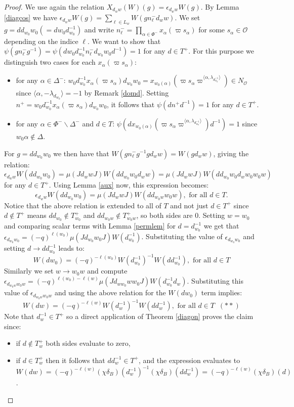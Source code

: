 \documentclass[10pt,a4paper]{amsart}
\begin{document}
\begin{proof}
We use again the relation $X_{d_ww}(W)(g)=\epsilon_{d_ww}W(g)$. By Lemma \ref{diagcos} we have
$\epsilon_{d_ww}W(g)=\sum\limits_{\ell\in L_w}W(gn_{\ell}^-d_ww)$. We set $g=dd_{w_0}w_0(=dw_0d_{w_0}^{-1})$ and write $n_{\ell}^-=\prod\limits_{\alpha\in \Phi^-}x_{\alpha}(\varpi s_{\alpha})$ for some $s_{\alpha}\in\mathcal{O}$ depending on the indice $\ell$. We want to show that $\psi(gn_{\ell}^-g^{-1})=\psi(dw_0d_{w_0}^{-1}n_{\ell}^-d_{w_0}w_0d^{-1})=1$ for any $d\in T^+$. For this purpose we distinguish two cases for each $x_{\alpha}(\varpi s_{\alpha})$: 
\begin{itemize}
    \item for any $\alpha\in\Delta^-$: $w_0d_{w_0}^{-1}x_{\alpha}(\varpi s_{\alpha})d_{w_0}w_0=x_{w_0(\alpha)}(\varpi s_{\alpha}\varpi^{\langle\alpha,\lambda_{d_{w_0}^{-1}}\rangle})\in N_{\mathcal{O}}$ since $\langle\alpha,-\lambda_{d_{w_0}}\rangle={-1}$ by Remark \ref{domd}. Setting $n^+=w_0d_{w_0}^{-1}x_{\alpha}(\varpi s_{\alpha})d_{w_0}w_0$, it follows that $\psi(dn^+d^{-1})=1$ for any $d\in T^+$.
    \item for any $\alpha\in\Phi^-\backslash\Delta^-$ and $d\in T$: $\psi(dx_{w_0(\alpha)}(\varpi s_{\alpha}\varpi^{\langle\alpha,\lambda_{d_{w_0}^{-1}}\rangle})d^{-1})=1$ since $w_0\alpha\not\in\Delta$.
\end{itemize} For $g=dd_{w_0}w_0$ we then have that $W(gn_{\ell}^-g^{-1}gd_ww)=W(gd_ww)$, giving the relation:  $$\epsilon_{d_ww}W(dd_{w_0}w_0)=\mu(Jd_wwJ)W(dd_{w_0}w_0d_ww)=\mu(Jd_wwJ)W(dd_{w_0}w_0d_ww_0w_0w)$$ for any $d\in T^+$. Using Lemma \ref{aux} now, this expression becomes:
$$\epsilon_{d_ww}W(dd_{w_0}w_0)=\mu(Jd_wwJ)W(dd_{w_0w}w_0w),\text{ for all } d\in T.$$
Notice that the above relation is extended to all of $T$ and not just $d\in T^+$ since $d\not\in T^+$ means $dd_{w_0}\not\in T_{w_0}^+$ and $dd_{w_0w}\not\in T_{w_0w}^+$, so both sides are $0$.
Setting $w=w_0$ and comparing scalar terms with Lemma \ref{permlem} for $d=d_{w_0}^{-1}$ we get that $\epsilon_{d_{w_0}w_0}=(-q)^{\ell(w_0)}\mu(Jd_{w_0}w_0J)W(d_{w_0}^{-1})$. Substituting the value of $\epsilon_{d_{w_0}w_0}$ and setting $d\to dd_{w_0}^{-1}$ leads to: 
$$W(dw_0)=(-q)^{-\ell(w_0)}W(d_{w_0}^{-1})^{-1}W(dd_{w_0}^{-1}), \text{ for all } d\in T$$ Similarly we set $w\to w_0w$ and compute $\epsilon_{d_{w_0w}w_0w}=(-q)^{\ell(w_0)-\ell(w)}\mu(Jd_{ww_0}ww_0J)W(d_{w_0}^{-1}d_w)$. Substituting this value of $\epsilon_{d_{w_0w}w_0w}$ and using the above relation for the $W(dw_0)$ term implies:
$$W(dw)=(-q)^{-\ell(w)}W(d_{w}^{-1})^{-1}W(dd_{w}^{-1}), \text{ for all } d\in T \; \; (**)$$ Note that $d_w^{-1}\in T^+$ so a direct application of Theorem \ref{diagon} proves the claim since: 
\begin{itemize}
    \item if $d\not\in T_w^+$ both sides evaluate to zero,
    \item if $d\in T_w^+$ then it follows that $dd_w^{-1}\in T^+$, and the expression evaluates to $W(dw)=(-q)^{-\ell(w)}(\chi\delta_B)(d_w^{-1})^{-1}(\chi\delta_B)(dd_w^{-1})=(-q)^{-\ell(w)}(\chi\delta_B)(d)$.
\end{itemize}
\end{proof}
\end{document}
